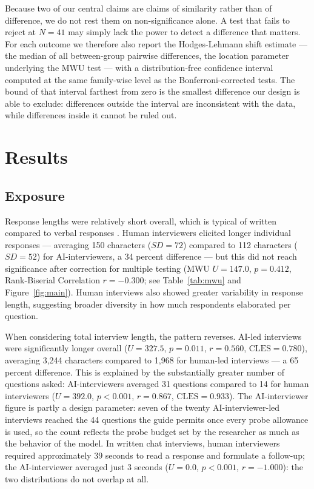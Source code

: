 \documentclass[12pt]{article}
\newcommand{\AII}{AI-interviewer}
\newcommand{\AIIs}{AI-interviewers}
\begin{document}
Because two of our central claims are claims of similarity rather than of difference, we do not rest them on non-significance alone. A test that fails to reject at $N = 41$ may simply lack the power to detect a difference that matters. For each outcome we therefore also report the Hodges-Lehmann shift estimate --- the median of all between-group pairwise differences, the location parameter underlying the MWU test --- with a distribution-free confidence interval computed at the same family-wise level as the Bonferroni-corrected tests. The bound of that interval farthest from zero is the smallest difference our design is able to exclude: differences outside the interval are inconsistent with the data, while differences inside it cannot be ruled out.

\section*{Results}

\subsection*{Exposure}

Response lengths were relatively short overall, which is typical of written compared to verbal responses \citep{HohneGavras2022}. Human interviewers elicited longer individual responses --- averaging 150 characters ($SD = 72$) compared to 112 characters ($SD = 52$) for \AIIs{}, a 34 percent difference --- but this did not reach significance after correction for multiple testing (MWU $U = 147.0$, $p = 0.412$, Rank-Biserial Correlation $r = -0.300$; see Table~\ref{tab:mwu} and Figure~\ref{fig:main}). Human interviews also showed greater variability in response length, suggesting broader diversity in how much respondents elaborated per question.

When considering total interview length, the pattern reverses. AI-led interviews were significantly longer overall ($U = 327.5$, $p = 0.011$, $r = 0.560$, $\mathrm{CLES} = 0.780$), averaging 3,244 characters compared to 1,968 for human-led interviews --- a 65 percent difference. This is explained by the substantially greater number of questions asked: \AIIs{} averaged 31 questions compared to 14 for human interviewers ($U = 392.0$, $p < 0.001$, $r = 0.867$, $\mathrm{CLES} = 0.933$). The \AII{} figure is partly a design parameter: seven of the twenty \AII{}-led interviews reached the 44 questions the guide permits once every probe allowance is used, so the count reflects the probe budget set by the researcher as much as the behavior of the model. In written chat interviews, human interviewers required approximately 39 seconds to read a response and formulate a follow-up; the \AII{} averaged just 3 seconds ($U = 0.0$, $p < 0.001$, $r = -1.000$): the two distributions do not overlap at all.
\end{document}
